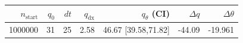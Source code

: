 \begin{tabular}{r r r r r r r}
\hline
$n_{\mathrm{start}}$ & $q_0$ & $dt$ & $q_{\mathrm{dx}}$ & $q_{\theta}$ (CI) & $\Delta q$ & $\Delta\theta$ \\
\hline
1000000 & 31 & 25 & 2.58 & 46.67 [39.58,71.82] & -44.09 & -19.961 \\
\hline
\end{tabular}

